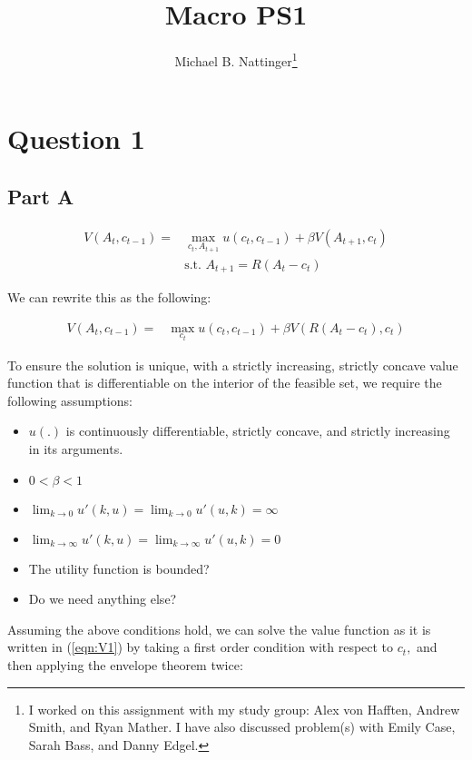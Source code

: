 \documentclass[11pt]{article} %
\title{Macro PS1}
\author{Michael B. Nattinger\footnote{I worked on this assignment with my study group: Alex von Hafften, Andrew Smith, and Ryan Mather. I have also discussed problem(s) with Emily Case, Sarah Bass, and Danny Edgel.}}
\begin{document}
\maketitle
\section{Question 1}
\subsection{Part A}
\begin{align*}
V(A_t,c_{t-1}) = &\max_{c_t,A_{t+1}} u(c_t,c_{t-1}) + \beta V(A_{t+1},c_t)\\
&\text{s.t. } A_{t+1} = R(A_t - c_t)
\end{align*}

We can rewrite this as the following:

\begin{align}
V(A_t,c_{t-1}) = &\max_{c_t} u(c_t,c_{t-1}) + \beta V(R(A_t - c_t),c_t) \label{eqn:V1}%
\end{align}

To ensure the solution is unique, with a strictly increasing, strictly concave value function that is differentiable on the interior of the feasible set, we require the following assumptions:
\begin{itemize}
\item $u(.)$ is continuously differentiable, strictly concave, and strictly increasing in its arguments.
\item $0<\beta <1$
\item $\lim_{k\rightarrow 0} u'(k,u) = \lim_{k\rightarrow 0} u'(u,k) = \infty$
\item $\lim_{k\rightarrow \infty} u'(k,u) = \lim_{k\rightarrow \infty} u'(u,k) = 0$
\item The utility function is bounded?
\item Do we need anything else?
\end{itemize}

Assuming the above conditions hold, we can solve the value function as it is written in (\ref{eqn:V1}) by taking a first order condition with respect to $c_t,$ and then applying the envelope theorem twice:
\end{document}
